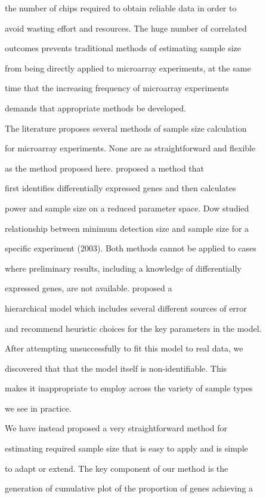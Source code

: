 \documentclass[12pt]{article}
\begin{document}
the number of chips required to obtain reliable data in order to

avoid wasting effort and resources. The huge number of correlated

outcomes prevents traditional methods of estimating sample size

from being directly applied to microarray experiments, at the same

time that the increasing frequency of microarray experiments

demands that appropriate methods be developed.



The literature proposes several methods of sample size calculation

for microarray experiments. None are as straightforward and flexible

as the method proposed here. \citet{Hwang02} proposed a method that

first identifies differentially expressed genes and then calculates

power and sample size on a reduced parameter space. Dow studied

relationship between minimum detection size and sample size for a

specific experiment (2003). Both methods cannot be applied to cases

where preliminary results, including a knowledge of differentially

expressed genes, are not available. \citet{Zien03} proposed a

hierarchical model which includes several different sources of error

and recommend heuristic choices for the key parameters in the model.

After attempting unsuccessfully to fit this model to real data, we

discovered that that the model itself is non-identifiable.  This

makes it inappropriate to employ across the variety of sample types

we see in practice.



We have instead proposed a very straightforward method for

estimating required sample size that is easy to apply and is simple

to adapt or extend. The key component of our method is the

generation of cumulative plot of the proportion of genes achieving a
\end{document}
